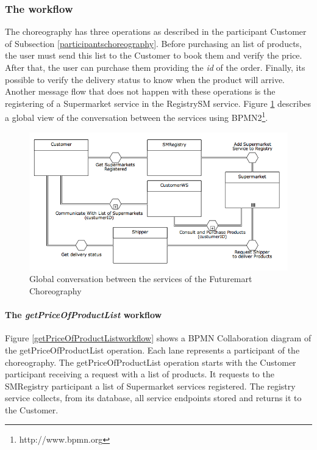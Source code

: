 \subsubsection{The workflow}
The choreography has three operations as described in the participant Customer of Subsection \ref{participantschoreography}. Before purchasing an list of products, the user must send this list to the Customer to book them and verify the price. After that, the user can purchase them providing the \emph{id} of the order. Finally, its possible to verify the delivery status to know when the product will arrive. Another message flow that does not happen with these operations is the registering of a Supermarket service in the RegistrySM service. Figure \ref{futuremartConversation} describes a global view of the conversation between the services using BPMN2\footnote{http://www.bpmn.org}.

\begin{figure}[htbp]
\begin{center}
	\includegraphics[width=\textwidth]{images/futuremartConversation}
\caption{Global conversation between the services of the Futuremart Choreography}
\label{futuremartConversation}
\end{center}
\end{figure}

\paragraph{The \emph{getPriceOfProductList} workflow\\}
Figure \ref{getPriceOfProductListworkflow} shows a BPMN Collaboration diagram of the getPriceOfProductList operation. Each lane represents a participant of the choreography. The getPriceOfProductList operation starts with the Customer participant receiving a request with a list of products. It requests to the SMRegistry participant a list of Supermarket services registered. The registry service collects, from its database, all service endpoints stored and returns it to the Customer.

